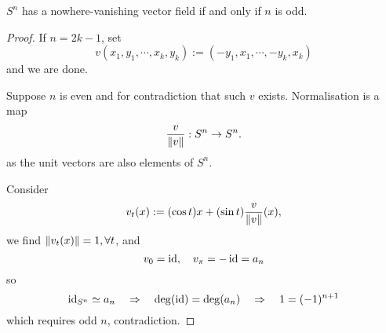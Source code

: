 \documentclass[a4paper,11pt]{article}
\begin{document}
	\begin{prop}
		$S^n$ has a nowhere-vanishing vector field if and only if $n$ is odd.
	\end{prop}

	\begin{proof}
		If $n = 2k-1$, set 
		\[
			v(x_1,y_1, \cdots, x_k, y_k) := (-y_1,x_1,\cdots, -y_k, x_k)
		\]
		and we are done.

		Suppose $n$ is even and for contradiction that such $v$ exists. Normalisation is a map
		\[
			\frac{v}{\norm{v}} : S^n \to S^n.
		\]
		as the unit vectors are also elements of $S^n$.

		Consider 
		\[
			v_t(x):= (\cos t)x + (\sin t) \frac{v}{\norm{v}}(x),
		\]
		we find $\norm{v_t(x)} = 1, \forall t$, and
		\[
			v_0 = \operatorname{id}, \quad v_\pi = - \operatorname{id} = a_n
		\]
		so
		\[
			\operatorname{id} _{S^n} \simeq a_n \quad \Rightarrow \quad \deg(\operatorname{id}) = \deg(a_n) \quad \Rightarrow \quad 1 = (-1)^{n+1}
		\]
		which requires odd $n$, contradiction.
	\end{proof}
\end{document}
